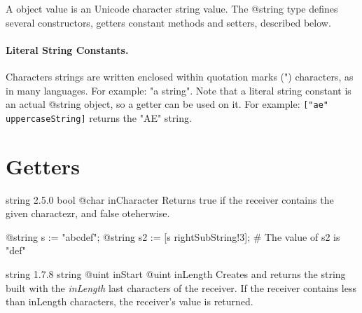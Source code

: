 

A  object value is an Unicode character string value. The @string type defines several constructors, getters constant methods and setters, described below.

\paragraph{Literal String Constants.}

Characters strings are written enclosed within quotation marks (") characters, as in many languages. For example: "a string". Note that a literal string constant is an actual @string object, so a getter can be used on it. For example: \lstinline[language=galgas]{["ae" uppercaseString]} returns the "AE" string.

\section{Getters}

{string}
{2.5.0}
{bool}
{@char inCharacter}
{Returns true if the receiver contains the given charactezr, and false oteherwise.}
{}

\begin{galgascode}
@string s := "abcdef";
@string s2 := [s rightSubString!3]; # The value of s2 is "def"
\end{galgascode}

{string}
{1.7.8}
{string}
{@uint inStart}
{@uint inLength}
{Creates and returns the string built with the \emph{inLength} last characters of the receiver. If the receiver contains less than inLength characters, the receiver’s value is returned.}
{}


